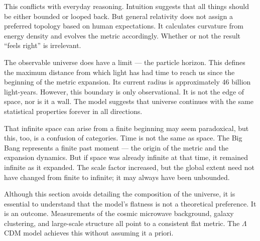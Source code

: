This conflicts with everyday reasoning. Intuition suggests that all things should be either bounded or looped back. But general relativity does not assign a preferred topology based on human expectations. It calculates curvature from energy density and evolves the metric accordingly. Whether or not the result “feels right” is irrelevant.

The observable universe does have a limit — the particle horizon. This defines the maximum distance from which light has had time to reach us since the beginning of the metric expansion. Its current radius is approximately 46 billion light-years. However, this boundary is only observational. It is not the edge of space, nor is it a wall. The model suggests that universe continues with the same statistical properties forever in all directions.

That infinite space can arise from a finite beginning may seem paradoxical, but this, too, is a confusion of categories. Time is not the same as space. The Big Bang represents a finite past moment — the origin of the metric and the expansion dynamics. But if space was already infinite at that time, it remained infinite as it expanded. The scale factor increased, but the global extent need not have changed from finite to infinite; it may always have been unbounded.

Although this section avoids detailing the composition of the universe, it is essential to understand that the model's flatness is not a theoretical preference. It is an outcome. Measurements of the cosmic microwave background, galaxy clustering, and large-scale structure all point to a consistent flat metric. The $\Lambda$CDM model achieves this without assuming it a priori. 

